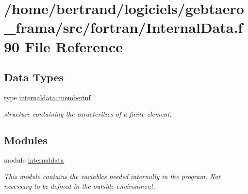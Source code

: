 \hypertarget{_internal_data_8f90}{}\section{/home/bertrand/logiciels/gebtaero\+\_\+frama/src/fortran/\+Internal\+Data.f90 File Reference}
\label{_internal_data_8f90}
\subsection*{Data Types}
\begin{DoxyCompactItemize}
\item 
type \hyperlink{structinternaldata_1_1memberinf}{internaldata\+::memberinf}
\begin{DoxyCompactList}\small\item\em structure containing the caracteritics of a finite element. \end{DoxyCompactList}\end{DoxyCompactItemize}
\subsection*{Modules}
\begin{DoxyCompactItemize}
\item 
module \hyperlink{namespaceinternaldata}{internaldata}
\begin{DoxyCompactList}\small\item\em This module contains the variables needed internally in the program. Not necessary to be defined in the outside environment. \end{DoxyCompactList}\end{DoxyCompactItemize}
